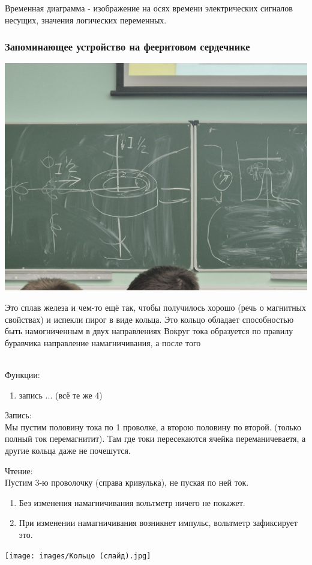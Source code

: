 \documentclass[12px]{article}
\begin{document}
Временная диаграмма - изображение на осях времени электрических сигналов несущих, значения логических переменных. \\

\subsubsection{Запоминающее устройство на фееритовом сердечнике}
\begin{center}
	\includegraphics[width=0.7\linewidth]{images/Кольцо.jpg}
\end{center}

Это сплав железа и чем-то ещё так, чтобы получилось хорошо (речь о магнитных свойствах) и испекли пирог в виде кольца. Это кольцо обладает способностью быть намогниченным в двух направлениях
Вокруг тока образуется по правилу буравчика направление намагничивания, а после того

\\
Функции:
\begin{enumerate}
	\item запись ... (всё те же 4)
\end{enumerate}
Запись:\\
Мы пустим половину тока по 1 проволке, а второю половину по второй. (только полный ток перемагнитит). Там где токи пересекаются ячейка переманичеваетя, а другие кольца даже не почешутся. 

Чтение:\\
Пустим 3-ю проволочку (справа кривулька), не пуская по ней ток. 
\begin{enumerate}
	\item Без изменения намагничивания вольтметр ничего не покажет.
	\item При изменении намагничивания возникнет импульс, вольтметр зафиксирует это.
\end{enumerate}
\begin{center}
	\texttt{[image: images/Кольцо (слайд).jpg]}
\end{center}
\end{document}
